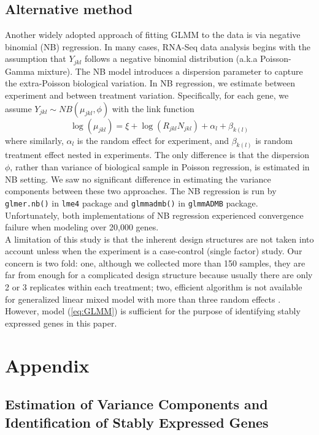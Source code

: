 \documentclass[11pt, a4paper]{article}
\begin{document}
  \subsection{Alternative method}
Another widely adopted approach of fitting GLMM to the data is via negative binomial (NB) regression. In many cases,  RNA-Seq data analysis begins with the assumption that $Y_{jkl}$ follows a negative binomial distribution (a.k.a Poisson-Gamma mixture). The NB model introduces a dispersion parameter to capture the extra-Poisson biological variation.  In NB regression, we estimate between experiment and between treatment variation. Specifically,  for each gene, we assume $Y_{jkl}\sim NB(\mu_{jkl}, \phi)$ with the link function
 \[\log(\mu_{jkl})= \xi + \log(R_{jkl}N_{jkl}) + \alpha_l + \beta_{k(l)}\]
where similarly, $\alpha_l$ is the random effect for experiment, and $\beta_{k(l)}$ is random treatment effect nested in experiments.  The only difference is that the dispersion $\phi$, rather than variance of biological sample in Poisson regression, is estimated in NB setting. We saw no significant difference in estimating the variance components between these two approaches. The NB regression is run by \verb"glmer.nb()" in \verb"lme4" package\citep{bates2012lme4} and \verb"glmmadmb()" in \verb"glmmADMB" package\citep{bolker2012getting}. Unfortunately, both implementations of NB regression experienced convergence failure when modeling over 20,000 genes. \\

A limitation of this study is that the inherent design structures are not taken into account unless when the experiment is a case-control (single factor) study. Our concern is two fold: one, although we collected more than 150 samples, they are far from enough for a complicated design structure because usually there are only 2 or 3 replicates within each treatment;  two, efficient algorithm is not available for generalized linear mixed model with more than three random effects \citep{bolker2009generalized}. However, model (\ref{eq:GLMM}) is sufficient for the purpose of identifying stably expressed genes in this paper.



\section{Appendix}


\subsection*{ Estimation of Variance Components and Identification of Stably Expressed Genes}
\end{document}
